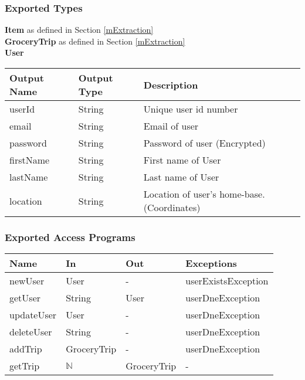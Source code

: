 \documentclass[12pt, titlepage]{article}
\begin{document}
\subsubsection{Exported Types}
\textbf{Item} as defined in Section \ref{mExtraction} \\

\noindent \textbf{GroceryTrip} as defined in Section \ref{mExtraction} \\

\noindent \textbf{User}

\begin{table}[H]
  \begin{tabular}{|p{}|p{}|p{}|}
    \hline
    \textbf{Output Name} & \textbf{Output Type} & \textbf{Description} \\
    \hline
    userId & String & Unique user id number \\
    \hline
    email & String & Email of user \\
    \hline
    password & String & Password of user (Encrypted) \\
    \hline
    firstName & String & First name of User \\
    \hline
    lastName & String & Last name of User \\
    \hline
    location & String & Location of user's home-base. (Coordinates) \\
    \hline
  \end{tabular}
\end{table}

\subsubsection{Exported Access Programs}

\begin{center}
\begin{tabular}{p{5cm} p{3cm} p{3cm} p{5cm}}
\hline
\textbf{Name} & \textbf{In} & \textbf{Out} & \textbf{Exceptions} \\
\hline
newUser & User & - & userExistsException \\
getUser & String & User & userDneException \\
updateUser & User & - & userDneException \\
deleteUser & String & - & userDneException \\
addTrip & GroceryTrip & - & userDneException \\
getTrip & $\mathbb{N}$ & GroceryTrip & - \\
\hline
\end{tabular}
\end{center}
\end{document}
